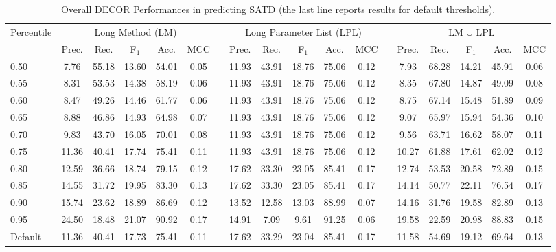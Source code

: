 \begin{table*}[t]
	\caption{Overall DECOR Performances in predicting SATD (the last line reports results for default thresholds).}
	\label{tab:decor}
	\centering
	\begin{scriptsize}
		\begin{adjustbox}{center}
			\begin{tabular}{lccccclccccclccccc}
				\multirow{2}{*}{Percentile} & \multicolumn{5}{c}{Long Method (LM)} & & \multicolumn{5}{c}{Long Parameter List (LPL)} & & \multicolumn{5}{c}{LM $\cup$ LPL}\\
				\cline{2-18}
				& Prec. & Rec. & F$_1$ & Acc. & MCC &  & Prec. & Rec. & F$_1$ & Acc. & MCC &  & Prec. & Rec. & F$_1$ & Acc. & MCC\\
				\hline
				0.50 & 7.76 & 55.18 & 13.60 & 54.01 & 0.05 &  & 11.93 & 43.91 & 18.76 & 75.06 & 0.12 &  & 7.93 & 68.28 & 14.21 & 45.91 & 0.06\\
				0.55 & 8.31 & 53.53 & 14.38 & 58.19 & 0.06 &  & 11.93 & 43.91 & 18.76 & 75.06 & 0.12 &  & 8.35 & 67.80 & 14.87 & 49.09 & 0.08\\
				0.60 & 8.47 & 49.26 & 14.46 & 61.77 & 0.06 &  & 11.93 & 43.91 & 18.76 & 75.06 & 0.12 &  & 8.75 & 67.14 & 15.48 & 51.89 & 0.09\\
				0.65 & 8.88 & 46.86 & 14.93 & 64.98 & 0.07 &  & 11.93 & 43.91 & 18.76 & 75.06 & 0.12 &  & 9.07 & 65.97 & 15.94 & 54.36 & 0.10\\
				0.70 & 9.83 & 43.70 & 16.05 & 70.01 & 0.08 &  & 11.93 & 43.91 & 18.76 & 75.06 & 0.12 &  & 9.56 & 63.71 & 16.62 & 58.07 & 0.11\\
				0.75 & 11.36 & 40.41 & 17.74 & 75.41 & 0.11 &  & 11.93 & 43.91 & 18.76 & 75.06 & 0.12 &  & 10.27 & 61.88 & 17.61 & 62.02 & 0.12\\
				0.80 & 12.59 & 36.66 & 18.74 & 79.15 & 0.12 &  & 17.62 & 33.30 & 23.05 & 85.41 & 0.17 &  & 12.74 & 53.53 & 20.58 & 72.89 & 0.15\\
				0.85 & 14.55 & 31.72 & 19.95 & 83.30 & 0.13 &  & 17.62 & 33.30 & 23.05 & 85.41 & 0.17 &  & 14.14 & 50.77 & 22.11 & 76.54 & 0.17\\
				0.90 & 15.74 & 23.62 & 18.89 & 86.69 & 0.12 &  & 13.52 & 12.58 & 13.03 & 88.99 & 0.07 &  & 14.16 & 31.76 & 19.58 & 82.89 & 0.13\\
				0.95 & 24.50 & 18.48 & 21.07 & 90.92 & 0.17 &  & 14.91 & 7.09 & 9.61 & 91.25 & 0.06 &  & 19.58 & 22.59 & 20.98 & 88.83 & 0.15\\
				\hline
				Default & 11.36 & 40.41 & 17.73 & 75.41 & 0.11 & &  17.62 & 33.29 & 23.04 & 85.41 & 0.17 & & 11.58 & 54.69 & 19.12 & 69.64 & 0.13\\
				\hline
			\end{tabular}
		\end{adjustbox}
	\end{scriptsize}
	\vspace{-3mm}
\end{table*}

